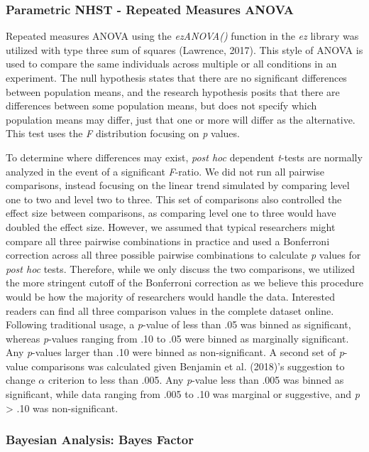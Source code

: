 \documentclass[,man, mask]{apa6}
\theoremstyle{definition}
\theoremstyle{definition}
\theoremstyle{definition}
\theoremstyle{remark}
\begin{document}
\subsubsection{Parametric NHST - Repeated Measures
ANOVA}\label{parametric-nhst---repeated-measures-anova}

Repeated measures ANOVA using the \emph{ezANOVA()} function in the
\emph{ez} library was utilized with type three sum of squares (Lawrence,
2017). This style of ANOVA is used to compare the same individuals
across multiple or all conditions in an experiment. The null hypothesis
states that there are no significant differences between population
means, and the research hypothesis posits that there are differences
between some population means, but does not specify which population
means may differ, just that one or more will differ as the alternative.
This test uses the \emph{F} distribution focusing on \emph{p} values.

To determine where differences may exist, \emph{post hoc} dependent
\emph{t}-tests are normally analyzed in the event of a significant
\emph{F}-ratio. We did not run all pairwise comparisons, instead
focusing on the linear trend simulated by comparing level one to two and
level two to three. This set of comparisons also controlled the effect
size between comparisons, as comparing level one to three would have
doubled the effect size. However, we assumed that typical researchers
might compare all three pairwise combinations in practice and used a
Bonferroni correction across all three possible pairwise combinations to
calculate \emph{p} values for \emph{post hoc} tests. Therefore, while we
only discuss the two comparisons, we utilized the more stringent cutoff
of the Bonferroni correction as we believe this procedure would be how
the majority of researchers would handle the data. Interested readers
can find all three comparison values in the complete dataset online.
Following traditional usage, a \emph{p}-value of less than .05 was
binned as significant, whereas \emph{p}-values ranging from .10 to .05
were binned as marginally significant. Any \emph{p}-values larger than
.10 were binned as non-significant. A second set of \emph{p}-value
comparisons was calculated given Benjamin et al. (2018)'s suggestion to
change \(\alpha\) criterion to less than .005. Any \emph{p}-value less
than .005 was binned as significant, while data ranging from .005 to .10
was marginal or suggestive, and \emph{p} \textgreater{} .10 was
non-significant.

\subsubsection{Bayesian Analysis: Bayes
Factor}\label{bayesian-analysis-bayes-factor}
\end{document}
